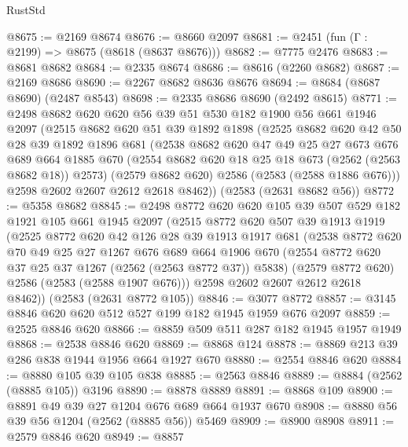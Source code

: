 \begin{lexlean}{RustStd}
\begin{coremodule}
@8675 := @2169 @8674
@8676 := @8660 @2097
@8681 := @2451 (fun (Γ : @2199) => @8675 (@8618 (@8637 @8676)))
@8682 := @7775 @2476
@8683 := @8681 @8682
@8684 := @2335 @8674
@8686 := @8616 (@2260 @8682)
@8687 := @2169 @8686
@8690 := @2267 @8682 @8636 @8676
@8694 := @8684 (@8687 @8690) (@2487 @8543)
@8698 := @2335 @8686 @8690 (@2492 @8615)
@8771 := @2498
    @8682
    @620
    @620
    @56
    @39
    @51
    @530
    @182
    @1900
    @56
    @661
    @1946
    @2097
    (@2515
      @8682
      @620
      @51
      @39
      @1892
      @1898
      (@2525
        @8682
        @620
        @42
        @50
        @28
        @39
        @1892
        @1896
        @681
        (@2538
          @8682
          @620
          @47
          @49
          @25
          @27
          @673
          @676
          @689
          @664
          @1885
          @670
          (@2554 @8682 @620 @18 @25 @18 @673 (@2562 (@2563 @8682 @18)) @2573)
          (@2579 @8682 @620)
          @2586
          (@2583 (@2588 @1886 @676)))
        @2598
        @2602
        @2607
        @2612
        @2618
        @8462))
    (@2583 (@2631 @8682 @56))
@8772 := @5358 @8682
@8845 := @2498
    @8772
    @620
    @620
    @105
    @39
    @507
    @529
    @182
    @1921
    @105
    @661
    @1945
    @2097
    (@2515
      @8772
      @620
      @507
      @39
      @1913
      @1919
      (@2525
        @8772
        @620
        @42
        @126
        @28
        @39
        @1913
        @1917
        @681
        (@2538
          @8772
          @620
          @70
          @49
          @25
          @27
          @1267
          @676
          @689
          @664
          @1906
          @670
          (@2554 @8772 @620 @37 @25 @37 @1267 (@2562 (@2563 @8772 @37)) @5838)
          (@2579 @8772 @620)
          @2586
          (@2583 (@2588 @1907 @676)))
        @2598
        @2602
        @2607
        @2612
        @2618
        @8462))
    (@2583 (@2631 @8772 @105))
@8846 := @3077 @8772
@8857 := @3145 @8846 @620 @620 @512 @527 @199 @182 @1945 @1959 @676 @2097
@8859 := @2525 @8846 @620
@8866 := @8859 @509 @511 @287 @182 @1945 @1957 @1949
@8868 := @2538 @8846 @620
@8869 := @8868 @124
@8878 := @8869 @213 @39 @286 @838 @1944 @1956 @664 @1927 @670
@8880 := @2554 @8846 @620
@8884 := @8880 @105 @39 @105 @838
@8885 := @2563 @8846
@8889 := @8884 (@2562 (@8885 @105)) @3196
@8890 := @8878 @8889
@8891 := @8868 @109
@8900 := @8891 @49 @39 @27 @1204 @676 @689 @664 @1937 @670
@8908 := @8880 @56 @39 @56 @1204 (@2562 (@8885 @56)) @5469
@8909 := @8900 @8908
@8911 := @2579 @8846 @620
@8949 := @8857

\end{coremodule}
\end{lexlean}
